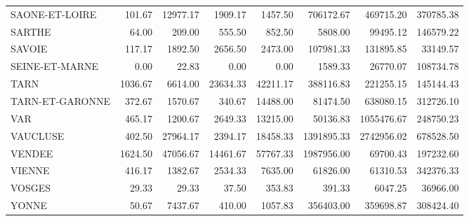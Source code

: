 \documentclass[11pt, a4paper]{article}
\begin{document}
\begin{tabular}{lrrrrrrr}
  SAONE-ET-LOIRE & 101.67 & 12977.17 & 1909.17 & 1457.50 & 706172.67 & 469715.20 & 370785.38 \\ 
  SARTHE & 64.00 & 209.00 & 555.50 & 852.50 & 5808.00 & 99495.12 & 146579.22 \\ 
  SAVOIE & 117.17 & 1892.50 & 2656.50 & 2473.00 & 107981.33 & 131895.85 & 33149.57 \\ 
  SEINE-ET-MARNE & 0.00 & 22.83 & 0.00 & 0.00 & 1589.33 & 26770.07 & 108734.78 \\
  TARN & 1036.67 & 6614.00 & 23634.33 & 42211.17 & 388116.83 & 221255.15 & 145144.43 \\ 
  TARN-ET-GARONNE & 372.67 & 1570.67 & 340.67 & 14488.00 & 81474.50 & 638080.15 & 312726.10 \\ 
  VAR & 465.17 & 1200.67 & 2649.33 & 13215.00 & 50136.83 & 1055476.67 & 248750.23 \\ 
  VAUCLUSE & 402.50 & 27964.17 & 2394.17 & 18458.33 & 1391895.33 & 2742956.02 & 678528.50 \\ 
  VENDEE & 1624.50 & 47056.67 & 14461.67 & 57767.33 & 1987956.00 & 69700.43 & 197232.60 \\ 
  VIENNE & 416.17 & 1382.67 & 2534.33 & 7635.00 & 61826.00 & 61310.53 & 342376.33 \\ 
  VOSGES & 29.33 & 29.33 & 37.50 & 353.83 & 391.33 & 6047.25 & 36966.00 \\ 
  YONNE & 50.67 & 7437.67 & 410.00 & 1057.83 & 356403.00 & 359698.87 & 308424.40 \\
   \hline
\end{tabular}
\FloatBarrier
\newpage
\end{document}
